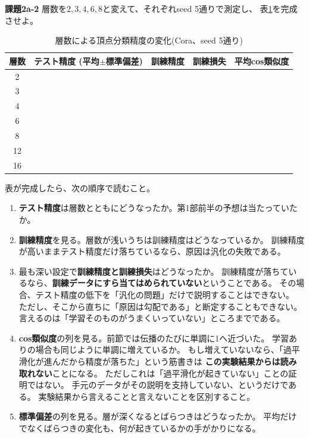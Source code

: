 \documentclass[11pt,a4paper]{jsarticle}
\begin{document}
\begin{screen}
\textbf{課題2a-2} \quad 層数を$2,3,4,6,8$と変えて、それぞれseed 5通りで測定し、
表\ref{tab:depth}を完成させよ。
\end{screen}

\begin{table}[h]
\caption{層数による頂点分類精度の変化(Cora、seed 5通り)}
\label{tab:depth}
\begin{center}
\begin{tabular}{|c||p{3.0cm}|p{1.8cm}|p{1.8cm}|p{2.2cm}|}
\hline
層数 & テスト精度 (平均$\pm$標準偏差) & 訓練精度 & 訓練損失 & 平均cos類似度 \\
\hline\hline
2  & & & & \\
\hline
3  & & & & \\
\hline
4  & & & & \\
\hline
6  & & & & \\
\hline
8  & & & & \\
\hline
12 & & & & \\
\hline
16 & & & & \\
\hline
\end{tabular}
\end{center}
\end{table}

\noindent
表が完成したら、次の順序で読むこと。

\begin{enumerate}
\item \textbf{テスト精度}は層数とともにどうなったか。第1部前半の予想は当たっていたか。
\item \textbf{訓練精度}を見る。層数が浅いうちは訓練精度はどうなっているか。
  訓練精度が高いままテスト精度だけ落ちているなら、原因は汎化の失敗である。
\item 最も深い設定で\textbf{訓練精度と訓練損失}はどうなったか。
  訓練精度が落ちているなら、\textbf{訓練データにすら当てはめられていない}ということである。
  その場合、テスト精度の低下を「汎化の問題」だけで説明することはできない。
  ただし、そこから直ちに「原因は勾配である」と断定することもできない。
  言えるのは「学習そのものがうまくいっていない」ところまでである。
\item \textbf{cos類似度}の列を見る。前節では伝播のたびに単調に1へ近づいた。
  学習ありの場合も同じように単調に増えているか。
  もし増えていないなら、「過平滑化が進んだから精度が落ちた」という筋書きは
  \textbf{この実験結果からは読み取れない}ことになる。
  ただしこれは「過平滑化が起きていない」ことの証明ではない。
  手元のデータがその説明を支持していない、というだけである。
  実験結果から言えることと言えないことを区別すること。
\item \textbf{標準偏差}の列を見る。層が深くなるとばらつきはどうなったか。
  平均だけでなくばらつきの変化も、何が起きているかの手がかりになる。
\end{enumerate}
\end{document}
